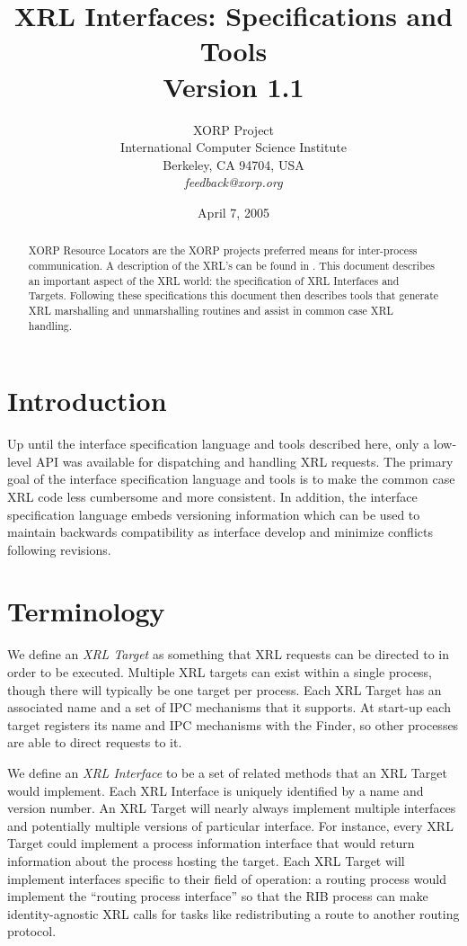 \documentclass[11pt]{article}
\title{
XRL Interfaces: Specifications and Tools \\
\vspace{1ex} Version 1.1
}
\author{ XORP Project					\\
	 International Computer Science Institute	\\
	 Berkeley, CA 94704, USA			\\
	 {\it feedback@xorp.org}
}
\date{April 7, 2005}
\begin{document}
\maketitle

\begin{abstract}
XORP Resource Locators are the XORP projects preferred means for
inter-process communication.  A description of the XRL's can be found
in \cite{xorp:xrl}.  This document describes an important aspect of the XRL
world: the specification of XRL Interfaces and Targets.  Following
these specifications this document then describes tools that generate
XRL marshalling and unmarshalling routines and assist in common case
XRL handling.
\end{abstract}

\section{Introduction}

Up until the interface specification language and tools described
here, only a low-level API was available for dispatching and handling
XRL requests.  The primary goal of the interface specification
language and tools is to make the common case XRL code less cumbersome
and more consistent.  In addition, the interface specification
language embeds versioning information which can be used to maintain
backwards compatibility as interface develop and minimize conflicts
following revisions.

\section{Terminology}

We define an \emph{XRL Target} as something that XRL requests can be
directed to in order to be executed.  Multiple XRL targets can
exist within a single process, though there will typically be one
target per process.  Each XRL Target has an associated name and a set
of IPC mechanisms that it supports.  At start-up each target registers
its name and IPC mechanisms with the Finder, so other processes are
able to direct requests to it.

We define an \emph{XRL Interface} to be a set of related methods that
an XRL Target would implement.  Each XRL Interface is uniquely
identified by a name and version number.  An XRL Target will nearly
always implement multiple interfaces and potentially multiple versions
of particular interface.  For instance, every XRL Target could
implement a process information interface that would return
information about the process hosting the target.  Each XRL Target
will implement interfaces specific to their field of operation: a
routing process would implement the ``routing process interface'' so
that the RIB process can make identity-agnostic XRL calls for tasks
like redistributing a route to another routing protocol.
\end{document}
